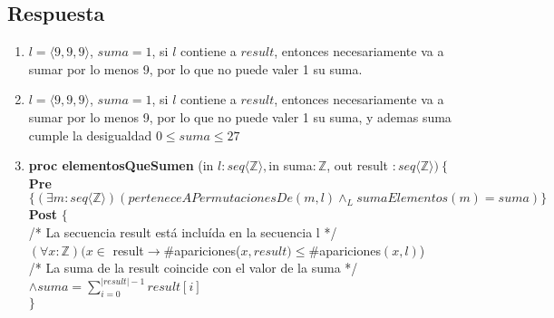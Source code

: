 \documentclass[a4paper]{article}
\begin{document}
\subsection*{Respuesta}
	\begin{enumerate}[label=\alph*)]
		\item $l= \langle 9,9,9\rangle$, $suma=1$, si $l$ contiene a $result$, entonces necesariamente va a sumar por lo menos 9, por lo que no puede valer 1 su suma.
		\item $l= \langle 9,9,9\rangle$, $suma=1$, si $l$ contiene a $result$, entonces necesariamente va a sumar por lo menos 9, por lo que no puede valer 1 su suma, y ademas suma cumple la desigualdad $0\leq suma\leq 27$
		\item \textbf{proc elementosQueSumen }(in $l:seq\langle \mathbb{Z}\rangle,$in suma$:\mathbb{Z}$, out result $:seq\langle \mathbb{Z}\rangle)\ \{$\\
\hspace*{6mm}\textbf{Pre }$\{(\exists m:seq\langle \mathbb{Z}\rangle)(perteneceAPermutacionesDe(m,l)\wedge_L sumaElementos(m)=suma)\}$\\
\hspace*{6mm}\textbf{Post }$\{$\\
\hspace*{6mm}/* La secuencia result está incluída en la secuencia l */\\
\hspace*{6mm}$(\forall x:\mathbb{Z})(x\in $ result$ \rightarrow \#$apariciones($x,result)\leq \#$apariciones$(x,l)$)\\
\hspace*{6mm}/* La suma de la result coincide con el valor de la suma */\\
\hspace*{6mm}$\wedge suma=\sum_{i=0}^{|result|-1}result[i]$\\
\hspace*{6mm}$\}$\\
	\end{enumerate}
	
\end{document}
